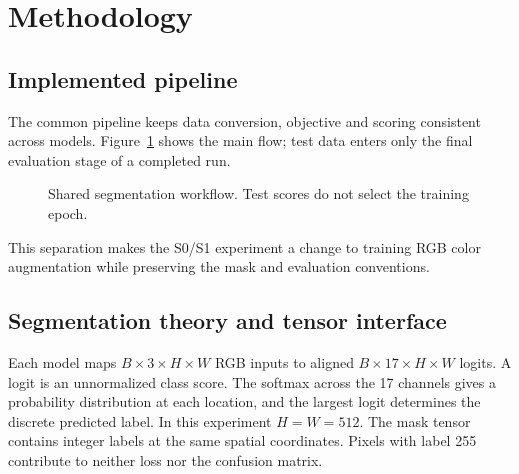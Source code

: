 \section{Methodology}
\subsection{Implemented pipeline}
The common pipeline keeps data conversion, objective and scoring consistent across models. Figure~\ref{fig:pipeline} shows the main flow; test data enters only the final evaluation stage of a completed run.
\begin{figure}[H]\centering
{}
\caption{Shared segmentation workflow. Test scores do not select the training epoch.}\label{fig:pipeline}
\end{figure}
This separation makes the S0/S1 experiment a change to training RGB color augmentation while preserving the mask and evaluation conventions.

\subsection{Segmentation theory and tensor interface}
Each model maps $B\times3\times H\times W$ RGB inputs to aligned $B\times17\times H\times W$ logits. A logit is an unnormalized class score. The softmax across the 17 channels gives a probability distribution at each location, and the largest logit determines the discrete predicted label. In this experiment $H=W=512$. The mask tensor contains integer labels at the same spatial coordinates. Pixels with label 255 contribute to neither loss nor the confusion matrix.

